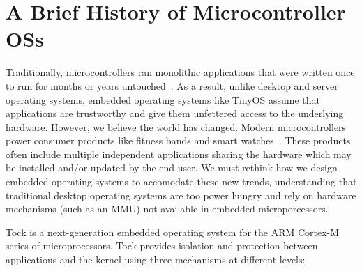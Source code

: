 \section{A Brief History of Microcontroller OSs}

Traditionally, microcontrollers ran monolithic applications that were written
once to run for months or years untouched~. As a result,
unlike desktop and server operating systems, embedded operating systems like
TinyOS assume that applications are trustworthy and give them unfettered
access to the underlying hardware. However, we believe the world has changed.
Modern microcontrollers power consumer products like fitness bands and smart
watches~. These products often
include multiple independent applications sharing the hardware which may be
installed and/or updated by the end-user. We must rethink how we design
embedded operating systems to accomodate these new trends, understanding that
traditional desktop operating systems are too power hungry and rely on
hardware mechanisms (such as an MMU) not available in embedded
microporcessors.

Tock is a next-generation embedded operating system for the ARM Cortex-M
series of microprocessors. Tock provides isolation and protection between
applications and the kernel using three mechanisms at different levels:

